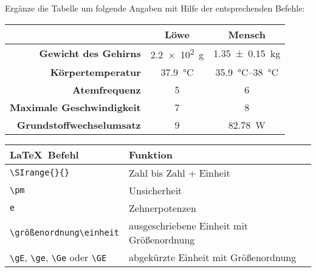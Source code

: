 \begin{frame}[fragile]
	\vspace{-0.3cm}
	\begin{Aufgabe}
		Ergänze die Tabelle um folgende Angaben mit Hilfe der entsprechenden Befehle:
	\end{Aufgabe}
	\begin{outputbox}
		\begin{center}
			\begin{tabular}{r|cc}
				\hline
				&	\textbf{Löwe}										& \textbf{Mensch} 						\\ \hline 
				\textbf{Gewicht des Gehirns}		&	\SI{2.2 e2}{\g}										& \SI{1.35 \pm 0.15}{\kg}				\\ 
				\textbf{Körpertemperatur}			&	\SI{37.9}{\degreeCelsius}							& \SIrange{35.9}{38}{\degreeCelsius}	\\
				\textbf{Atemfrequenz}				&	5								& 6					\\
				\textbf{Maximale Geschwindigkeit}	&	7								& 8				\\ 
				\textbf{Grundstoffwechselumsatz}	&	9	&  \SI{82.78}{\watt}\\
				\hline
			\end{tabular}
		\end{center}
	\end{outputbox}

	\begin{center}
	\begin{tabular}{ll}
		\toprule
		\LaTeX\ Befehl						&	Funktion									\\ \midrule
		\lstinline|\SIrange{}{}|			&	Zahl bis Zahl + Einheit						\\
		\lstinline|\pm			|			&	Unsicherheit								\\		
		\lstinline|e			|			&	Zehnerpotenzen						\\		
		\lstinline|\größenordnung\einheit|	&	ausgeschriebene Einheit	mit Größenordnung	\\
		\lstinline|\gE|, \lstinline|\ge|, \lstinline|\Ge| oder \lstinline|\GE|&	abgekürzte Einheit mit Größenordnung		\\
		\bottomrule
	\end{tabular}
\end{center}
	\vspace{0.1cm}
\end{frame}

